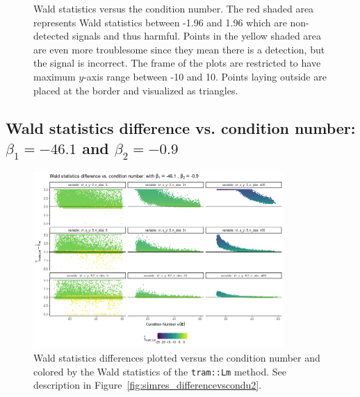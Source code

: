 \documentclass[11pt,a4paper,twoside]{book}\usepackage[]{graphicx}\usepackage[]{xcolor}
\begin{document}
\begin{figure}[H]
\begin{subfigure}[b]{1\textwidth}
\end{subfigure}
\vspace*{-1cm}
\caption{Wald statistics versus the condition number. The red shaded area represents Wald statistics between -1.96 and 1.96 which are non-detected signals and thus harmful. Points in the yellow shaded area are even more troublesome since they mean there is a detection, but the signal is incorrect. The frame of the plots are restricted to have maximum $y$-axis range between -10 and 10. Points laying outside are placed at the border and visualized as triangles.}
\label{fig:simres_wald2}
\end{figure}

\vspace*{-1cm}
\subsection{Wald statistics difference vs. condition number: $\beta_1=-46.1$ and $\beta_2=-0.9$}
\begin{figure}[H]
\vspace*{-0.5cm}
\centering
\includegraphics[width=0.85\textwidth]{../fromsim/simana11-1.png}
\vspace*{-0.5cm}
\caption{Wald statistics differences plotted versus the condition number and colored by the Wald statistics of the \texttt{tram::Lm} method. See description in Figure~\ref{fig:simres_differencevscondu2}.}
\label{fig:simres_differencevscondu1}
\end{figure}

\end{document}
